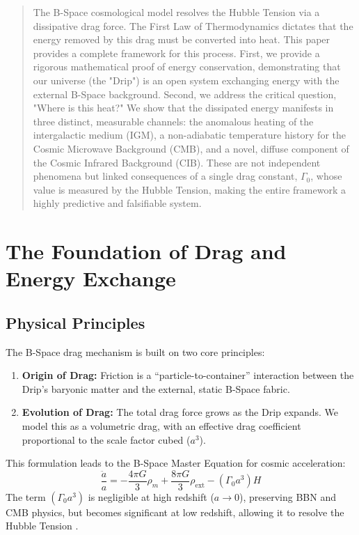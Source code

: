 \documentclass{BSpacePaper} %
\begin{document}
\makeBSCSsupplementtitle

\begin{abstract}
\noindent
The B-Space cosmological model resolves the Hubble Tension via a dissipative drag force. The First Law of Thermodynamics dictates that the energy removed by this drag must be converted into heat. This paper provides a complete framework for this process. First, we provide a rigorous mathematical proof of energy conservation, demonstrating that our universe (the "Drip") is an open system exchanging energy with the external B-Space background. Second, we address the critical question, "Where is this heat?" We show that the dissipated energy manifests in three distinct, measurable channels: the anomalous heating of the intergalactic medium (IGM), a non-adiabatic temperature history for the Cosmic Microwave Background (CMB), and a novel, diffuse component of the Cosmic Infrared Background (CIB). These are not independent phenomena but linked consequences of a single drag constant, $\Gamma_0$, whose value is measured by the Hubble Tension, making the entire framework a highly predictive and falsifiable system.
\end{abstract}

\section{The Foundation of Drag and Energy Exchange}

\subsection{Physical Principles}
The B-Space drag mechanism is built on two core principles:
\begin{enumerate}
    \item \textbf{Origin of Drag:} Friction is a ``particle-to-container'' interaction between the Drip's baryonic matter and the external, static B-Space fabric.
    \item \textbf{Evolution of Drag:} The total drag force grows as the Drip expands. We model this as a volumetric drag, with an effective drag coefficient proportional to the scale factor cubed ($a^3$).
\end{enumerate}
This formulation leads to the B-Space Master Equation for cosmic acceleration:
\begin{equation}
    \frac{\ddot{a}}{a} = -\frac{4\pi G}{3}\rho_m + \frac{8\pi G}{3}\rho_{\text{ext}} - \left(\Gamma_0 a^3\right) H
    \label{eq:master}
\end{equation}
The term $(\Gamma_0 a^3)$ is negligible at high redshift ($a \to 0$), preserving BBN and CMB physics, but becomes significant at low redshift, allowing it to resolve the Hubble Tension \citep{Riess2022, Planck2020}.
\end{document}
